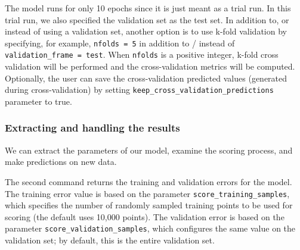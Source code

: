 %

\waterExampleInR


\waterExampleInPython



\noindent
The model runs for only 10 epochs since it is just meant  as a trial run. In this trial run, we also specified the validation set as the test set.  In addition to, or instead of using a validation set, another option is to use k-fold validation by specifying, for example, \texttt{nfolds = 5} in addition to / instead of \texttt{validation\_frame = test}.  When \texttt{nfolds} is a positive integer, k-fold cross validation will be performed and the cross-validation metrics will be computed.  Optionally, the user can save the cross-validation predicted values (generated during cross-validation) by setting \texttt{keep\_cross\_validation\_predictions} parameter to true.  

\subsubsection{Extracting and handling the results} 

We can extract the parameters of our model, examine the scoring process, and make predictions on new data.

\waterExampleInR
%


\waterExampleInPython
%



\noindent
The second command returns the training and validation errors for the model. The training error value is based on the parameter \texttt{score\_training\_samples}, which specifies the number of randomly sampled training points to be used for scoring (the default uses 10,000 points). The validation error is based on the parameter \texttt{score\_validation\_samples}, which configures the same value on the validation set; by default, this is the entire validation set.

